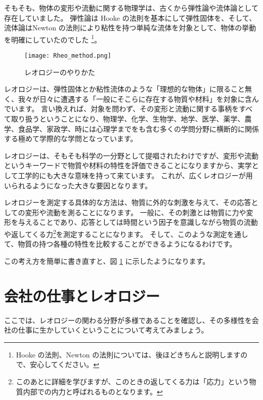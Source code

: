 \documentclass[uplatex,dvipdfmx,a4paper,11pt]{jsreport}
\begin{document}
そもそも、物体の変形や流動に関する物理学は、古くから弾性論や流体論として存在していました。
弾性論は Hooke の法則を基本にして弾性固体を、そして、流体論はNewton の法則により粘性を持つ単純な流体を対象として、物体の挙動を明確にしていたのでした
\footnote{
	Hooke の法則、Newton の法則については、後ほどきちんと説明しますので、安心してください。
}。
\begin{figure}[htb]
    \begin{center}
        \texttt{[image: Rheo\_method.png]}
        \caption{レオロジーのやりかた}
        \label{yarikata}
    \end{center}
\end{figure}

レオロジーは、弾性固体とか粘性流体のような「理想的な物体」に限ること無く、我々が日々に遭遇する「一般にそこらに存在する物質や材料」を対象に含んでいます。
言い換えれば、対象を問わず、その変形と流動に関する事柄をすべて取り扱うということになり、物理学、化学、生物学、地学、医学、薬学、農学、食品学、家政学、時には心理学までをも含む多くの学問分野に横断的に関係する極めて学際的な学問となっています。

レオロジーは、そもそも科学の一分野として提唱されたわけですが、変形や流動というキーワードで物質や材料の特性を評価できることになりますから、実学として工学的にも大きな意味を持って来ています。
これが、広くレオロジーが用いられるようになった大きな要因となります。

レオロジーを測定する具体的な方法は、物質に外的な刺激を与えて、その応答としての変形や流動を測ることになります。
一般に、その刺激とは物質に力や変形を与えることであり、応答としては時間という因子を意識しながら物質の流動や返してくる力\footnote{
	このあとに詳細を学びますが、このときの返してくる力は「応力」という物質内部での内力と呼ばれるものとなります。
}を測定することになります。
そして、このような測定を通して、物質の持つ各種の特性を比較することができるようになるわけです。

この考え方を簡単に書き直すと、図 \ref{yarikata} に示したようになります。

\section{会社の仕事とレオロジー}

ここでは、レオロジーの関わる分野が多様であることを確認し、その多様性を会社の仕事に生かしていくということについて考えてみましょう。
\end{document}
